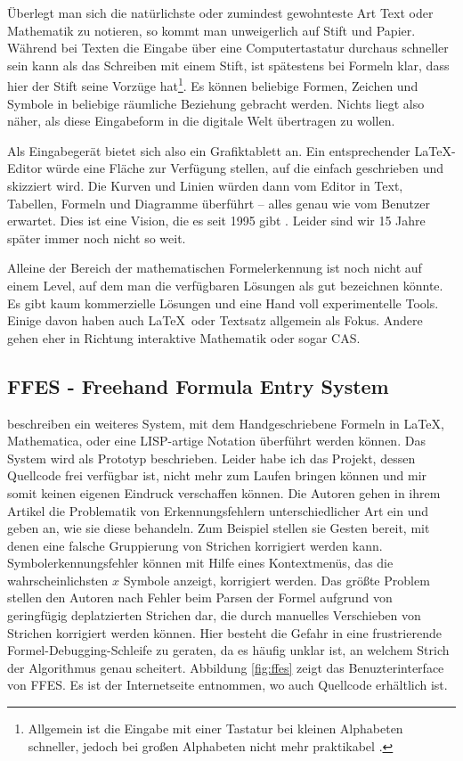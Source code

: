 Überlegt man sich die natürlichste oder zumindest gewohnteste Art Text oder Mathematik zu notieren, so kommt man unweigerlich auf Stift und Papier. Während bei Texten die Eingabe über eine Computertastatur durchaus schneller sein kann als das Schreiben mit einem Stift, ist spätestens bei Formeln klar, dass hier der Stift seine Vorzüge hat\footnote{Allgemein ist die Eingabe mit einer Tastatur bei kleinen Alphabeten schneller, jedoch bei großen Alphabeten nicht mehr praktikabel \cite{Tappert:1990p10302}.}. Es können beliebige Formen, Zeichen und Symbole in beliebige räumliche Beziehung gebracht werden. Nichts liegt also näher, als diese Eingabeform in die digitale Welt übertragen zu wollen.

Als Eingabegerät bietet sich also ein Grafiktablett an. Ein entsprechender \LaTeX-Editor würde eine Fläche zur Verfügung stellen, auf die einfach geschrieben und skizziert wird. Die Kurven und Linien würden dann vom Editor in Text, Tabellen, Formeln und Diagramme überführt -- alles genau wie vom Benutzer erwartet. Dies ist eine Vision, die es seit 1995 gibt \cite{Meyer:1995p10480}. Leider sind wir 15 Jahre später immer noch nicht so weit.

Alleine der Bereich der mathematischen Formelerkennung ist noch nicht auf einem Level, auf dem man die verfügbaren Lösungen als gut bezeichnen könnte. Es gibt kaum kommerzielle Lösungen und eine Hand voll experimentelle Tools. Einige davon haben auch \LaTeX~oder Textsatz allgemein als Fokus. Andere gehen eher in Richtung interaktive Mathematik oder sogar \ac{CAS}.

\subsection[FFES]{FFES - Freehand Formula Entry System}
\label{sub:ffes}

\citet{Smithies:1999p11806} beschreiben ein weiteres System, mit dem Handgeschriebene Formeln in \LaTeX, Mathematica, oder eine LISP-artige Notation überführt werden können. Das System wird als Prototyp beschrieben. Leider habe ich das Projekt, dessen Quellcode frei verfügbar ist, nicht mehr zum Laufen bringen können und mir somit keinen eigenen Eindruck verschaffen können. Die Autoren gehen in ihrem Artikel die Problematik von Erkennungsfehlern unterschiedlicher Art ein und geben an, wie sie diese behandeln. Zum Beispiel stellen sie Gesten bereit, mit denen eine falsche Gruppierung von Strichen korrigiert werden kann. Symbolerkennungsfehler können mit Hilfe eines Kontextmenüs, das die wahrscheinlichsten $x$ Symbole anzeigt, korrigiert werden. Das größte Problem stellen den Autoren nach Fehler beim Parsen der Formel aufgrund von geringfügig deplatzierten Strichen dar, die durch manuelles Verschieben von Strichen korrigiert werden können. Hier besteht die Gefahr in eine frustrierende Formel-Debugging-Schleife zu geraten, da es häufig unklar ist, an welchem Strich der Algorithmus genau scheitert. Abbildung \ref{fig:ffes} zeigt das Benuzterinterface von FFES. Es ist der Internetseite \cite{ffes} entnommen, wo auch Quellcode erhältlich ist.

